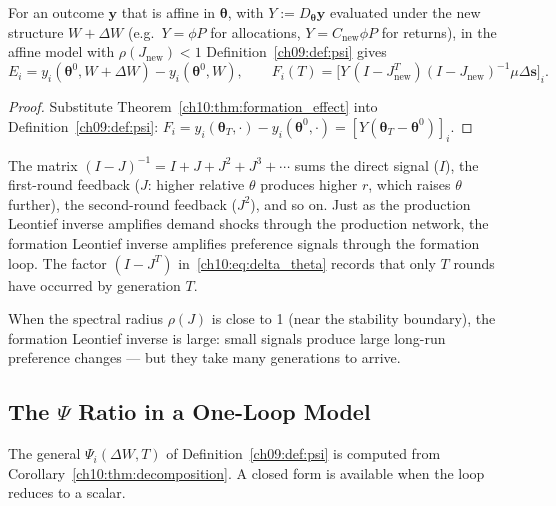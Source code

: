\documentclass[../structural_economics_book.tex]{subfiles}
\begin{document}
\begin{corollary}\label{ch10:thm:decomposition}
For an outcome $\mathbf{y}$ that is affine in $\boldsymbol{\theta}$, with $Y := D_{\boldsymbol{\theta}}\mathbf{y}$ evaluated under the new structure $W + \Delta W$ (e.g.\ $Y = \phi P$ for allocations, $Y = C_{\text{new}}\phi P$ for returns), in the affine model with $\rho(J_{\text{new}}) < 1$ Definition~\ref{ch09:def:psi} gives
\begin{equation}\label{ch10:eq:decomposition}
E_i = y_i(\boldsymbol{\theta}^0, W + \Delta W) - y_i(\boldsymbol{\theta}^0, W), \qquad
F_i(T) = \Big[Y\,(I - J_{\text{new}}^T)(I - J_{\text{new}})^{-1}\mu\Delta\mathbf{s}\Big]_i.
\end{equation}
\end{corollary}

\begin{proof}
Substitute Theorem~\ref{ch10:thm:formation_effect} into Definition~\ref{ch09:def:psi}: $F_i = y_i(\boldsymbol{\theta}_T, \cdot) - y_i(\boldsymbol{\theta}^0, \cdot) = [Y(\boldsymbol{\theta}_T - \boldsymbol{\theta}^0)]_i$.
\end{proof}

\begin{intuition}
The matrix $(I - J)^{-1} = I + J + J^2 + J^3 + \cdots$ sums the direct signal ($I$), the first-round feedback ($J$: higher relative $\theta$ produces higher $r$, which raises $\theta$ further), the second-round feedback ($J^2$), and so on. Just as the production Leontief inverse amplifies demand shocks through the production network, the formation Leontief inverse amplifies preference signals through the formation loop. The factor $(I - J^T)$ in~\eqref{ch10:eq:delta_theta} records that only $T$ rounds have occurred by generation $T$.

When the spectral radius $\rho(J)$ is close to 1 (near the stability boundary), the formation Leontief inverse is large: small signals produce large long-run preference changes --- but they take many generations to arrive.
\end{intuition}


\subsection{The $\Psi$ Ratio in a One-Loop Model}

The general $\Psi_i(\Delta W, T)$ of Definition~\ref{ch09:def:psi} is computed from Corollary~\ref{ch10:thm:decomposition}. A closed form is available when the loop reduces to a scalar.
\end{document}

